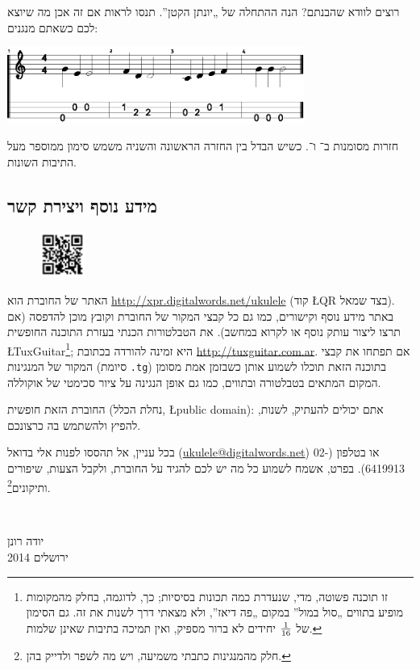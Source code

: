 רוצים לוודא שהבנתם? הנה ההתחלה של „יונתן הקטן”. תנסו לראות אם זה אכן מה שיוצא לכם כשאתם מנגנים:

\begin{center}
	\includegraphics[height=2.5cm]{jon.eps}
\end{center}

חזרות מסומנות ב־ ו־. כשיש הבדל בין החזרה הראשונה והשניה משמש סימון  ממוספר מעל התיבות השונות.



\subsection*{מידע נוסף ויצירת קשר}

\begin{figure}\vspace{-\baselineskip}\includegraphics[width=1.5cm]{retejo.png}\end{figure}
	האתר של החוברת הוא \url{http://xpr.digitalwords.net/ukulele} (קוד \L{QR} בצד שמאל). באתר מידע נוסף וקישורים, כמו גם כל קבצי המקור של החוברת וקובץ מוכן להדפסה (אם תרצו ליצור עותק נוסף או לקרוא במחשב). את הטבלטורות הכנתי בעזרת התוכנה החופשית \L{TuxGuitar}\footnote{זו תוכנה פשוטה, מדי, שנעדרת כמה תכונות בסיסיות; כך, לדוגמה, בחלק מהמקומות מופיע בתווים „סול במול” במקום „פה דיאז”, ולא מצאתי דרך לשנות את זה. גם הסימון של ${1}\over{16}$ יחידים לא ברור מספיק, ואין תמיכה בתיבות שאינן שלמות.}; היא זמינה להורדה בכתובת \url{http://tuxguitar.com.ar}. אם תפתחו את קבצי המקור של המנגינות (סיומת \texttt{.tg}) בתוכנה הזאת תוכלו לשמוע אותן כשבזמן אמת מסומן המקום המתאים בטבלטורה ובתווים, כמו גם אופן הנגינה על ציור סכימטי של אוקוללה.

החוברת הזאת חופשית (נחלת הכלל, \L{public domain}): אתם יכולים להעתיק, לשנות, להפיץ ולהשתמש בה כרצונכם.

בכל עניין, אל תהססו לפנות אלי בדואל (\url{ukulele@digitalwords.net}) או בטלפון (02-6419913). בפרט, אשמח לשמוע כל מה יש לכם להגיד על החוברת, ולקבל הצעות, שיפורים ותיקונים\footnote{חלק מהמנגינות כתבתי משמיעה, ויש מה לשפר ולדייק בהן.}.

\vspace{\baselineskip}
~\hfill
\begin{minipage}{3cm}
	יודה רונן\\
	ירושלים 2014\\
\end{minipage}
